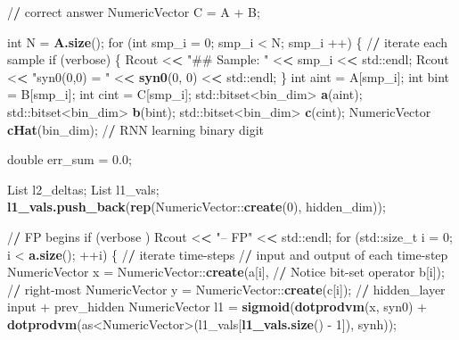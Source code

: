 \documentclass[]{article}
\newenvironment{Shaded}{\begin{snugshade}}{\end{snugshade}}
\newcommand{\KeywordTok}[1]{\textcolor[rgb]{0.13,0.29,0.53}{\textbf{{#1}}}}
\newcommand{\DataTypeTok}[1]{\textcolor[rgb]{0.13,0.29,0.53}{{#1}}}
\newcommand{\DecValTok}[1]{\textcolor[rgb]{0.00,0.00,0.81}{{#1}}}
\newcommand{\FloatTok}[1]{\textcolor[rgb]{0.00,0.00,0.81}{{#1}}}
\newcommand{\StringTok}[1]{\textcolor[rgb]{0.31,0.60,0.02}{{#1}}}
\newcommand{\ErrorTok}[1]{\textcolor[rgb]{0.64,0.00,0.00}{\textbf{{#1}}}}
\newcommand{\NormalTok}[1]{{#1}}
\begin{document}
\begin{Shaded}
\begin{Highlighting}[]
{{  \NormalTok{/}\ErrorTok{/}\StringTok{ }\NormalTok{correct answer}
  \NormalTok{NumericVector C =}\StringTok{ }\NormalTok{A +}\StringTok{ }\NormalTok{B;}

  \NormalTok{int N =}\StringTok{ }\KeywordTok{A.size}\NormalTok{();}
  \NormalTok{for (int }\DataTypeTok{smp_i =} \DecValTok{0}\NormalTok{; smp_i <}\StringTok{ }\NormalTok{N; smp_i ++) \{ /}\ErrorTok{/}\StringTok{ }\NormalTok{iterate each sample}
    \NormalTok{if (verbose) \{}
      \NormalTok{Rcout <}\ErrorTok{<}\StringTok{ "## Sample: "} \NormalTok{<}\ErrorTok{<}\StringTok{ }\NormalTok{smp_i <}\ErrorTok{<}\StringTok{ }\NormalTok{std::endl;}
      \NormalTok{Rcout <}\ErrorTok{<}\StringTok{ "syn0(0,0) = "} \NormalTok{<}\ErrorTok{<}\StringTok{ }\KeywordTok{syn0}\NormalTok{(}\DecValTok{0}\NormalTok{, }\DecValTok{0}\NormalTok{) <}\ErrorTok{<}\StringTok{ }\NormalTok{std::endl;}
    \NormalTok{\}}
    \NormalTok{int aint =}\StringTok{ }\NormalTok{A[smp_i];}
    \NormalTok{int bint =}\StringTok{ }\NormalTok{B[smp_i];}
    \NormalTok{int cint =}\StringTok{ }\NormalTok{C[smp_i];}
    \NormalTok{std::bitset<bin_dim>}\StringTok{ }\KeywordTok{a}\NormalTok{(aint);}
    \NormalTok{std::bitset<bin_dim>}\StringTok{ }\KeywordTok{b}\NormalTok{(bint);}
    \NormalTok{std::bitset<bin_dim>}\StringTok{ }\KeywordTok{c}\NormalTok{(cint);}
    \NormalTok{NumericVector }\KeywordTok{cHat}\NormalTok{(bin_dim); /}\ErrorTok{/}\StringTok{ }\NormalTok{RNN learning binary digit}

    \NormalTok{double err_sum =}\StringTok{ }\FloatTok{0.0}\NormalTok{;}

    \NormalTok{List l2_deltas;}
    \NormalTok{List l1_vals;}
    \KeywordTok{l1_vals.push_back}\NormalTok{(}\KeywordTok{rep}\NormalTok{(NumericVector::}\KeywordTok{create}\NormalTok{(}\DecValTok{0}\NormalTok{), hidden_dim));}

    \NormalTok{/}\ErrorTok{/}\StringTok{ }\NormalTok{FP begins}
    \NormalTok{if (verbose ) Rcout <}\ErrorTok{<}\StringTok{ "-- FP"} \NormalTok{<}\ErrorTok{<}\StringTok{ }\NormalTok{std::endl;}
    \NormalTok{for (std::size_t }\DataTypeTok{i =} \DecValTok{0}\NormalTok{; i <}\StringTok{ }\KeywordTok{a.size}\NormalTok{(); ++i) \{ /}\ErrorTok{/}\StringTok{ }\NormalTok{iterate time-steps}
      \NormalTok{/}\ErrorTok{/}\StringTok{ }\NormalTok{input and output of each time-step}
      \NormalTok{NumericVector x =}\StringTok{ }\NormalTok{NumericVector::}\KeywordTok{create}\NormalTok{(a[i], /}\ErrorTok{/}\StringTok{ }\NormalTok{Notice bit-set operator}
                                              \NormalTok{b[i]); /}\ErrorTok{/}\StringTok{ }\NormalTok{right-most}
      \NormalTok{NumericVector y =}\StringTok{ }\NormalTok{NumericVector::}\KeywordTok{create}\NormalTok{(c[i]);}
      \NormalTok{/}\ErrorTok{/}\StringTok{ }\NormalTok{hidden_layer ~}\StringTok{ }\NormalTok{input +}\StringTok{ }\NormalTok{prev_hidden}
      \NormalTok{NumericVector l1 =}\StringTok{ }\KeywordTok{sigmoid}\NormalTok{(}\KeywordTok{dotprodvm}\NormalTok{(x, syn0) +}
\StringTok{        }\KeywordTok{dotprodvm}\NormalTok{(as<NumericVector>(l1_vals[}\KeywordTok{l1_vals.size}\NormalTok{() -}\StringTok{ }\DecValTok{1}\NormalTok{]), synh));}
                                 
}}
\end{Highlighting}
\end{Shaded}
\end{document}
